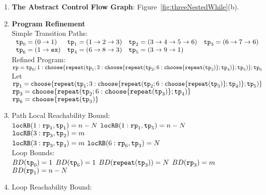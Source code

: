\begin{enumerate}
  \item  \textbf{The Abstract Control Flow Graph}: Figure~\ref{fig:threeNestedWhile}(b).

  \item \textbf{Program Refinement}
  \\
  {Simple Transition Paths:}
  \\
$
      \begin{array}{llll}
          \mathtt{tp}_0 = (0 \to 1)
          &
          \mathtt{tp}_1 = (1 \to 2 \to 3)
          &           
          \mathtt{tp}_2 = (3 \to 4 \to 5 \to 6)
          &
          \mathtt{tp}_3 = (6 \to 7 \to 6)
          \\
          \mathtt{tp}_6 = (1 \to \mathtt{ex})
          &
          \mathtt{tp}_4 = (6 \to 8 \to 3)
          &
          \mathtt{tp}_5 = (3 \to 9 \to 1)
      \end{array}
$
  \\
  Refined Program:
\\
  $
  \rprog = \tpath_0 ; 
  1: \rpchoose{\rprepeat(\tpath_1; 3: \rpchoose{\rprepeat(\tpath_2; 6 : \rpchoose{\rprepeat(\tpath_3)}; \tpath_4)}; \tpath_5)}; \tpath_6
$
\\
Let $\rprog_1 = \rpchoose{\rprepeat(\tpath_1; 3: \rpchoose{\rprepeat(\tpath_2; 6 : \rpchoose{\rprepeat(\tpath_3)}; \tpath_4)}; \tpath_5)}$
\\
$\rprog_3 = \rpchoose{\rprepeat(\tpath_2; 6 : \rpchoose{\rprepeat(\tpath_3)}; \tpath_4)}$
\\
$\rprog_6 = \rpchoose{\rprepeat(\tpath_3)}$
  \item {Path Local Reachability Bound}:
\\
$\mathtt{locRB}(1: \mathtt{rp}_1, \mathtt{tp}_1) = n - N$ \quad
$\mathtt{locRB}(1: \mathtt{rp}_1, \mathtt{tp}_5) = n - N$ \quad
$\mathtt{locRB}(3: \mathtt{rp}_3, \mathtt{tp}_2) = m$ \\
$\mathtt{locRB}(3: \mathtt{rp}_3, \mathtt{tp}_4) = m$ \quad
$\mathtt{locRB}(6: \mathtt{rp}_6, \mathtt{tp}_3) = N$ \quad
%
\\
Loop Bounds:
\\
$BD(\mathtt{tp}_0) = 1$
\quad
$BD(\mathtt{tp}_6) = 1$
\quad
$BD( \mathtt{repeat}(\mathtt{tp}_3)) = N $
\quad
$BD(\mathtt{rp}_3) = m $
\quad
$BD(\mathtt{rp}_1) = n - N $
%
\item Loop Reachability Bound:
\\
\end{enumerate}
